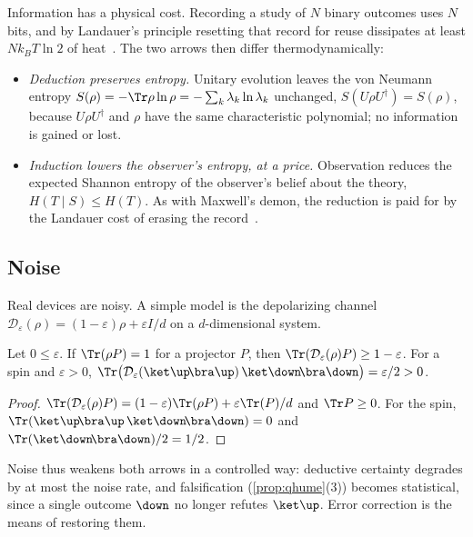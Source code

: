 Information has a physical cost. Recording a study of $N$ binary outcomes uses $N$ bits, and by
Landauer's principle resetting that record for reuse dissipates at least $N k_B T\ln 2$ of
heat~\cite{landauer,bennett}. The two arrows then differ thermodynamically:
\begin{itemize}
  \item \emph{Deduction preserves entropy.} Unitary evolution leaves the von Neumann entropy
        $S(\rho)=-\Tr\rho\ln\rho=-\sum_k\lambda_k\ln\lambda_k$ unchanged, $S(U\rho U^\dagger)=S(\rho)$,
        because $U\rho U^\dagger$ and $\rho$ have the same characteristic polynomial; no
        information is gained or lost.
  \item \emph{Induction lowers the observer's entropy, at a price.} Observation reduces the
        expected Shannon entropy of the observer's belief about the theory,
        $H(T\mid S)\le H(T)$. As with Maxwell's demon, the reduction is paid for by the
        Landauer cost of erasing the record~\cite{bennett}.
\end{itemize}

\subsection{Noise}\label{sec:noise}

Real devices are noisy. A simple model is the depolarizing channel
$\mathcal D_\varepsilon(\rho)=(1-\varepsilon)\rho+\varepsilon I/d$ on a $d$-dimensional system.

\begin{proposition}\label{prop:noise}
Let $0\le\varepsilon$. If $\Tr(\rho P)=1$ for a projector $P$, then
$\Tr(\mathcal D_\varepsilon(\rho)P)\ge1-\varepsilon$. For a spin and $\varepsilon>0$,
$\Tr\bigl(\mathcal D_\varepsilon(\ket\up\!\bra\up)\,\ket\down\!\bra\down\bigr)=\varepsilon/2>0$.
\end{proposition}

\begin{proof}
$\Tr(\mathcal D_\varepsilon(\rho)P)=(1-\varepsilon)\Tr(\rho P)+\varepsilon\Tr(P)/d$ and $\Tr P\ge0$. For
the spin, $\Tr(\ket\up\!\bra\up\,\ket\down\!\bra\down)=0$ and $\Tr(\ket\down\!\bra\down)/2=1/2$.
\end{proof}

Noise thus weakens both arrows in a controlled way: deductive certainty degrades by at most the
noise rate, and falsification (\cref{prop:qhume}(3)) becomes statistical, since a single outcome
$\down$ no longer refutes $\ket\up$. Error correction is the means of restoring them.

